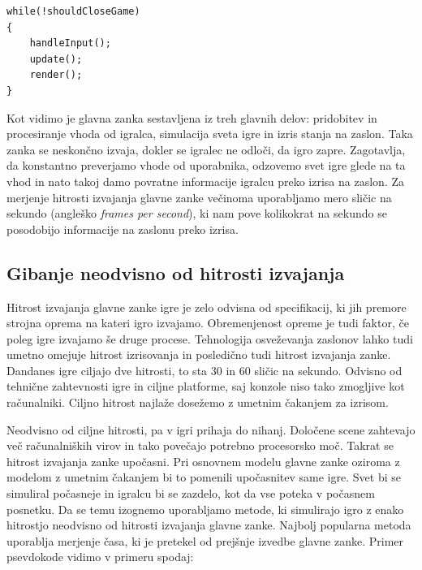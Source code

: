 \documentclass[12pt,a4paper,twoside]{book}
\begin{document}
\begin{listing}[ht]
\begin{verbatim}
while(!shouldCloseGame)
{
	handleInput();
	update();
	render();
}
\end{verbatim}
\vspace*{-2em}
\end{listing}
Kot vidimo je glavna zanka sestavljena iz treh glavnih delov: pridobitev in procesiranje vhoda od igralca, simulacija sveta igre in izris stanja na zaslon. Taka zanka se neskončno izvaja, dokler se igralec ne odloči, da igro zapre. Zagotavlja, da konstantno preverjamo vhode od uporabnika, odzovemo svet igre glede na ta vhod in nato takoj damo povratne informacije igralcu preko izrisa na zaslon. Za merjenje hitrosti izvajanja glavne zanke večinoma uporabljamo mero sličic na sekundo (angleško \textit{frames per second}), ki nam pove kolikokrat na sekundo se posodobijo informacije na zaslonu preko izrisa.

\subsection{Gibanje neodvisno od hitrosti izvajanja}
Hitrost izvajanja glavne zanke igre je zelo odvisna od specifikacij, ki jih premore strojna oprema na kateri igro izvajamo. Obremenjenost opreme je tudi faktor, če poleg igre izvajamo še druge procese. Tehnologija osveževanja zaslonov lahko tudi umetno omejuje hitrost izrisovanja in posledično tudi hitrost izvajanja zanke. Dandanes igre ciljajo dve hitrosti, to sta 30 in 60 sličic na sekundo. Odvisno od tehnične zahtevnosti igre in ciljne platforme, saj konzole niso tako zmogljive kot računalniki. Ciljno hitrost najlaže dosežemo z umetnim čakanjem za izrisom. 

Neodvisno od ciljne hitrosti, pa v igri prihaja do nihanj. Določene scene zahtevajo več računalniških virov in tako povečajo potrebno procesorsko moč. Takrat se hitrost izvajanja zanke upočasni. Pri osnovnem modelu glavne zanke oziroma z modelom z umetnim čakanjem bi to pomenili upočasnitev same igre. Svet bi se simuliral počasneje in igralcu bi se zazdelo, kot da vse poteka v počasnem posnetku. Da se temu izognemo uporabljamo metode, ki simulirajo igro z enako hitrostjo neodvisno od hitrosti izvajanja glavne zanke. Najbolj popularna metoda uporablja merjenje časa, ki je pretekel od prejšnje izvedbe glavne zanke. Primer psevdokode vidimo v primeru spodaj:
\end{document}
